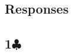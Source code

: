 \documentclass[10pt]{article}
\renewcommand{\c}{$\clubsuit$}
\renewcommand{\d}{$\diamondsuit$}
\newcommand{\h}{$\heartsuit$}
\newcommand{\s}{$\spadesuit$}
\newcommand{\p}{\textsuperscript{+}}
\newcommand{\x}{DBL}
\newcommand{\xx}{RDBL}
\newenvironment{bidtable}[1][]
{\textbf{#1}
  \begin{adjustwidth}{1em}{}
    \addvspace{2pt}
    \begin{tabbing}
      xxxxxxxx\=xxxxxxxx\=xxxxxxxx\=xxxxxxxx\=xxxxxxxx\=xxxxxxxx\=\kill}
{\end{tabbing}\end{adjustwidth}\bigskip}%
\newcommand{\pdfc}{\texorpdfstring{\c{}}{C}}
\begin{document}
\begin{multicols*}{2}
\section{Responses}
\subsection{1\pdfc}



\end{multicols*}
\end{document}
